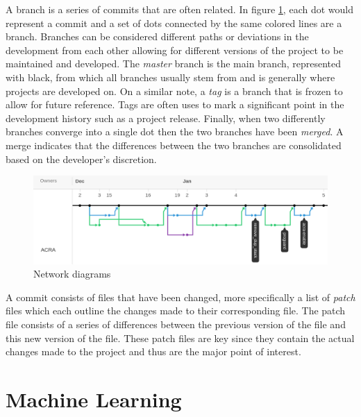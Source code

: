 A branch is a series of commits that are often related. In figure \ref{fig:network_diagram}, each dot would represent a commit and a set of dots connected by the same colored lines are a branch. Branches can be considered different paths or deviations in the development from each other allowing for different versions of the project to be maintained and developed. The \textit{master} branch is the main branch, represented with black, from which all branches usually stem from and is generally where projects are developed on. On a similar note, a \textit{tag} is a branch that is frozen to allow for future reference. Tags are often uses to mark a significant point in the development history such as a project release. Finally, when two differently branches converge into a single dot then the two branches have been \textit{merged}. A merge indicates that the differences between the two branches are consolidated based on the developer's discretion.

\begin{figure}[!ht]
    \centering
        \includegraphics[width=1.0\textwidth]{images/network}
    \caption{Network diagrams}
    \label{fig:network_diagram}
\end{figure}

A commit consists of files that have been changed, more specifically a list of \textit{patch} files which each outline the changes made to their corresponding file. The patch file consists of a series of differences between the previous version of the file and this new version of the file. These patch files are key since they contain the actual changes made to the project and thus are the major point of interest.


\section{Machine Learning}

